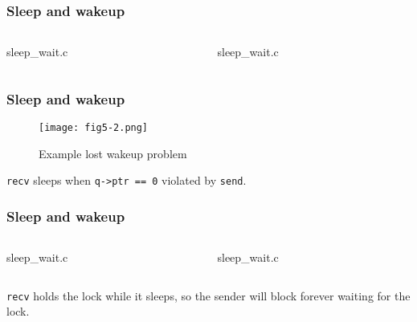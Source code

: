 \documentclass{beamer}
\begin{document}

\begin{frame}[t]
  \frametitle{Sleep and wakeup}
  \begin{columns}
    \begin{column}{.5\textwidth}
      
                      {sleep_wait.c}
    \end{column}
    \begin{column}{.425\textwidth}
      
                      {sleep_wait.c}
    \end{column}
  \end{columns}
  
\end{frame}


\begin{frame}[t]
  \frametitle{Sleep and wakeup}
  \begin{figure}[ht]
    \centering
    \texttt{[image: fig5-2.png]}
    \caption{Example lost wakeup problem}
  \end{figure}

  \texttt{recv} sleeps when \texttt{q->ptr == 0} violated by \texttt{send}.
  
\end{frame}


\begin{frame}[t]
  \frametitle{Sleep and wakeup}
  \begin{columns}
    \begin{column}{.5\textwidth}
      
                      {sleep_wait.c}
    \end{column}
    \begin{column}{.425\textwidth}
      
                      {sleep_wait.c}
    \end{column}
  \end{columns}

  \texttt{recv} holds the lock while it sleeps, so the sender will block
  forever waiting for the lock.
  
\end{frame}
\end{document}
